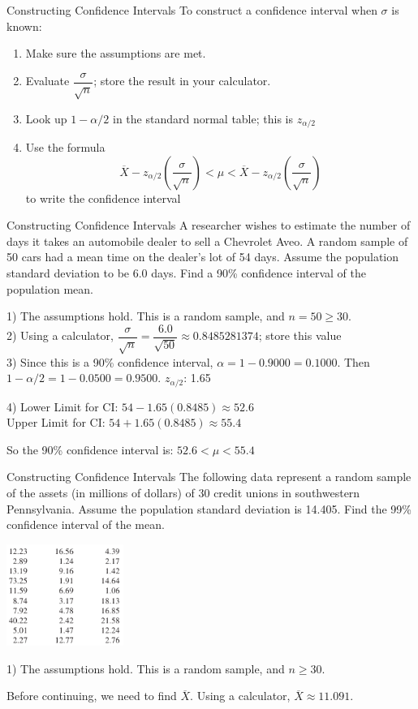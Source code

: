 \documentclass[t, aspectratio=169]{beamer}
\newcommand{\fp}[1]{\left({#1}\right)} %
\newcommand{\?}{\stackrel{?}{=}}
\begin{document}
	\begin{frame}{Constructing Confidence Intervals}
		To construct a confidence interval when $\sigma$ is known: \begin{enumerate}[1)]
			\item Make sure the assumptions are met. \pause
			\item Evaluate $\dfrac{\sigma}{\sqrt{n}}$; store the result in your calculator. \pause
			\item Look up $1 - \alpha / 2$ in the standard normal table; this is $z_{\alpha/2}$ \pause
			\item Use the formula $$\overline{X} - z_{\alpha/2}\fp{\dfrac{\sigma}{\sqrt{n}}} < \mu < \overline{X} - z_{\alpha/2}\fp{\dfrac{\sigma}{\sqrt{n}}}$$ to write the confidence interval
		\end{enumerate}
	\end{frame}

	\begin{frame}{Constructing Confidence Intervals}
		A researcher wishes to estimate the number of days it takes an automobile dealer to sell a Chevrolet Aveo. A random sample of 50 cars had a mean time on the dealer's lot of 54 days. Assume the population standard deviation to be 6.0 days. Find a 90\% confidence interval of the population mean. \pause
		
		1) The assumptions hold. This is a random sample, and $n = 50 \geq 30$. \pause \\
		2) Using a calculator, $\dfrac{\sigma}{\sqrt{n}} = \dfrac{6.0}{\sqrt{50}} \approx 0.8485281374$; store this value \pause \\
		3) Since this is a 90\% confidence interval, $\alpha = 1 - 0.9000 = 0.1000$. Then $1 - \alpha / 2 = 1 - 0.0500 = 0.9500$. \pause $z_{\alpha/2}$: 1.65 \pause
		
		4) Lower Limit for CI: $54 - 1.65(0.8485) \approx 52.6$ \pause \\
		Upper Limit for CI: $54 + 1.65(0.8485) \approx 55.4$ \pause
		
		So the 90\% confidence interval is: $52.6 < \mu < 55.4$
	\end{frame}

	\begin{frame}{Constructing Confidence Intervals}
		The following data represent a random sample of the assets (in millions of dollars) of 30 credit unions in southwestern Pennsylvania. Assume the population standard deviation is 14.405. Find the 99\% confidence interval of the mean.
		
		\includegraphics[width=1.5in]{pa-data.png} \pause
		
		1) The assumptions hold. This is a random sample, and $n \geq 30$. \pause
		
		Before continuing, we need to find $\overline{X}$. Using a calculator, $\overline{X} \approx 11.091$.
	\end{frame}
\end{document}
